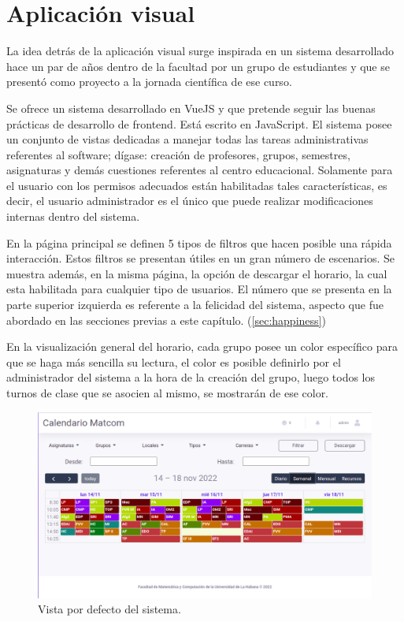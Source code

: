\section{Aplicación visual}

La idea detrás de la aplicación visual surge inspirada en un sistema desarrollado hace un par de años dentro de la facultad por un grupo de estudiantes y que se presentó como proyecto a la jornada científica de ese curso. \cite{horarios_fac}

Se ofrece un sistema desarrollado en VueJS y que pretende seguir las buenas prácticas de desarrollo de frontend. Está escrito en JavaScript. El sistema posee un conjunto de vistas dedicadas a manejar todas las tareas administrativas referentes al software; dígase: creación de profesores, grupos, semestres, asignaturas y demás cuestiones referentes al centro educacional. Solamente para el usuario con los permisos adecuados están habilitadas tales características, es decir, el usuario administrador es el único que puede realizar modificaciones internas dentro del sistema.

En la página principal se definen 5 tipos de filtros que hacen posible una rápida interacción. Estos filtros se presentan útiles en un gran número de escenarios. Se muestra además, en la misma página, la opción de descargar el horario, la cual esta habilitada para cualquier tipo de usuarios. El número que se presenta en la parte superior izquierda es referente a la felicidad del sistema, aspecto que fue abordado en las secciones previas a este capítulo. (\ref{sec:happiness})

En la visualización general del horario, cada grupo posee un color específico para que se haga más sencilla su lectura, el color es posible definirlo por el administrador del sistema a la hora de la creación del grupo, luego todos los turnos de clase que se asocien al mismo, se mostrarán de ese color.

\begin{figure}[h!]
	\centering
	\includegraphics[width=0.95\linewidth]{images/Chapter 3/home}
	\caption{Vista por defecto del sistema.}
	\label{fig:home}
\end{figure}



